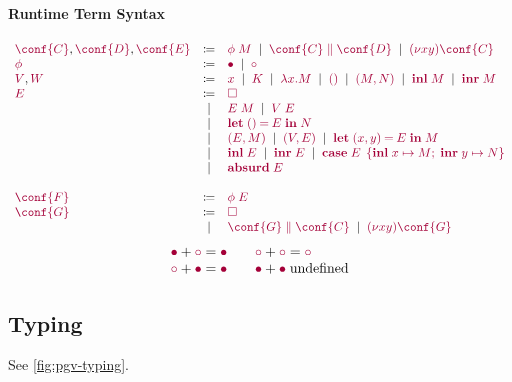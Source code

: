 \documentclass[main.tex]{subfiles}
\begin{document}
\paragraph*{Runtime Term Syntax}
\[
\begin{array}[t]{lcl}
  \tm{\conf{C}}, \tm{\conf{D}}, \tm{\conf{E}}
  & \coloneqq & \tm{\phi\;M}
    \sep        \tm{\ppar{\conf{C}}{\conf{D}}}
    \sep        \tm{\res{x}{y}{\conf{C}}}
  \\
  \tm{\phi}
  & \coloneqq & \tm{\main}
    \sep        \tm{\child}
  \\
  \tm{V}, \tm{W}
  & \coloneqq & \tm{x}
    \sep        \tm{K}
    \sep        \tm{\lambda x.M}
    \sep        \tm{\unit}
    \sep        \tm{\pair{M}{N}}
    \sep        \tm{\inl{M}}
    \sep        \tm{\inr{M}}
  \\
  \tm{E}
  & \coloneqq & \tm{\hole} \\
  & \sep      & \tm{E\;M}
    \sep        \tm{V\;E} \\
  & \sep      & \tm{\letunit{E}{N}} \\
  & \sep      & \tm{\pair{E}{M}}
    \sep        \tm{\pair{V}{E}}
    \sep        \tm{\letpair{x}{y}{E}{M}} \\
  & \sep      & \tm{\inl{E}}
    \sep        \tm{\inr{E}}
    \sep        \tm{\casesum{E}{x}{M}{y}{N}} \\
  & \sep      & \tm{\absurd{E}} \\
  \\
  \tm{\conf{F}}
  & \coloneqq & \tm{\phi\;E}
  \\
  \tm{\conf{G}}
  & \coloneqq & \tm{\hole} \\
  & \sep      & \tm{\ppar{\conf{G}}{\conf{C}}}
    \sep        \tm{\res{x}{y}{\conf{G}}}
\end{array}
\]
\[
\begin{array}{ll}
  \tm{\main}  + \tm{\child} = \tm{\main}
  \\
  \tm{\child} + \tm{\main}  = \tm{\main}
\end{array}
\quad
\begin{array}{ll}
  \tm{\child} + \tm{\child} = \tm{\child}
  \\
  \tm{\main}  + \tm{\main} \; \text{undefined}
\end{array}
\]

\subsection{Typing}
See \cref{fig:pgv-typing}.

\end{document}
